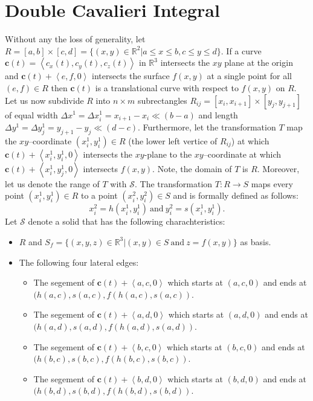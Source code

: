 \documentclass{article}
\theoremstyle{theorem}
\theoremstyle{definition}
\begin{document}
\section{Double Cavalieri Integral}
Without any the loss of generality, let $R = [a,b]\times [c,d] = \{(x,y)\in \mathbb{R}^2|a \leq x \leq b, c \leq y \leq d\}$.
If a curve $\mathbf{c}(t) = \left <c_x(t),c_y(t), c_z(t) \right >$ in $\mathbb{R}^3$ intersects the $xy$ plane at the origin and $\mathbf{c}(t) + \left < e,f,0 \right >$ intersects 
the surface $f(x,y)$ at a single point for all $(e,f)\in R$ then $\mathbf{c}(t)$ is a translational curve 
with respect to $f(x,y)$ on $R$. Let us now subdivide $R$ into $n\times m$ subrectangles $R_{ij} = [x_{i},x_{i+1}] \times [y_{j},y_{j+1}]$ of equal width $\Delta x^1 = \Delta x_i^1 = x_{i+1}-x_i\ll (b-a)$ and length $\Delta y^1= \Delta y_j^1 = y_{j+1}-y_j\ll(d-c)$. 
Furthermore, let the transformation $T$ map the $xy$--coordinate $(x_i^1,y_i^1)\in R$ (the lower left vertice of $R_{ij}$) at which $\mathbf{c}(t) + \left <x_i^1,y_i^1,0 \right >$ intersects the 
$xy$-plane to the $xy$--coordinate at which $\mathbf{c}(t) + \left <x_i^1,y_j^1,0 \right >$ intersects $f(x,y)$. Note, the domain of $T$ is $R$. Moreover, let us denote the range 
of $T$ with $\mathcal{S}$. The transformation $T:R\rightarrow S$ maps every point $(x_i^1,y_i^1)\in R$ to a point $(x_i^2,y_i^2)\in S$ and is formally defined as follows:
\begin{equation}
x_i^2 = h(x_i^1,y_i^1)~\textrm{and}~y_i^2 = s(x_i^1,y_i^1).
\end{equation}
Let $\mathcal{S}$ denote a solid that has the following charachteristics:
\begin{itemize}
 \item $R$ and $S_f = \{(x,y,z)\in\mathbb{R}^3|(x,y)\in S ~ \textrm{and} ~ z=f(x,y)\}$ as basis.
 \item The following four lateral edges:
 \begin{itemize}
 \item The segement of $\mathbf{c}(t) + \left <a, c,0\right>$ which starts at $(a,c,0)$ and ends at $(h(a,c),s(a,c),f(h(a,c),s(a,c))$.
 \item The segement of $\mathbf{c}(t) + \left <a, d,0\right>$ which starts at $(a,d,0)$ and ends at $(h(a,d),s(a,d),f(h(a,d),s(a,d))$.
 \item The segement of $\mathbf{c}(t) + \left <b, c,0\right>$ which starts at $(b,c,0)$ and ends at \\$(h(b,c),s(b,c),f(h(b,c),s(b,c))$.
 \item The segement of $\mathbf{c}(t) + \left <b, d,0\right>$ which starts at $(b,d,0)$ and ends at $(h(b,d),s(b,d),f(h(b,d),s(b,d))$.
 \end{itemize}
\end{itemize}
\end{document}
